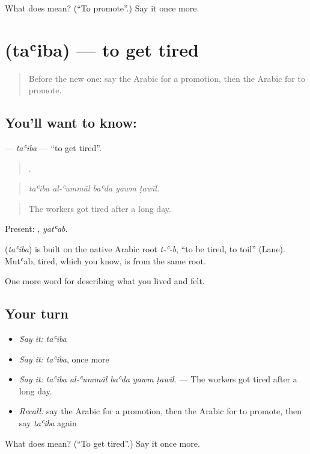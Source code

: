 \begin{tcolorbox}[breakable,colback=teal!4,colframe=teal!35!black,title={Before you move on}]
What does  mean? (\textquotedblleft{}To promote\textquotedblright{}.) Say it once more.
\end{tcolorbox}
\section[\texorpdfstring{\ar{تعب} (taʿiba)}{تعب (taʿiba)}]{ (taʿiba) — to get tired}

\label{lesson:AR-C521-taiba}



\begin{quote}
Before the new one: say the Arabic for a promotion, then the Arabic for to promote.
\end{quote}

\subsection*{You'll want to know: }
\textbf{} — \emph{taʿiba} — \textquotedblleft{}to get tired\textquotedblright{}.

\begin{quote}
    .
\end{quote}

\begin{quote}
\emph{taʿiba al-ʿummāl baʿda yawm ṭawīl.}
\end{quote}

\begin{quote}
The workers got tired after a long day.
\end{quote}

Present: , \emph{yatʿab}.

\begin{cousinweb}
\textbf{} (\emph{taʿiba}) is built on the native Arabic root \emph{t-ʿ-b}, \textquotedblleft{}to be tired, to toil\textquotedblright{} (Lane). Mutʿab, tired, which you know, is from the same root.
\end{cousinweb}

\begin{grammarlens}[title={What you've built}]
One more word for describing what you lived and felt.
\end{grammarlens}

\subsection*{Your turn}
\begin{itemize}
\raggedright
  \item \emph{Say it:} \emph{taʿiba}
  \item \emph{Say it:} \emph{taʿiba}, once more
  \item \emph{Say it:} \emph{taʿiba al-ʿummāl baʿda yawm ṭawīl.} — The workers got tired after a long day.
  \item \emph{Recall:} say the Arabic for a promotion, then the Arabic for to promote, then say \emph{taʿiba} again
\end{itemize}

\begin{tcolorbox}[breakable,colback=teal!4,colframe=teal!35!black,title={Before you move on}]
What does  mean? (\textquotedblleft{}To get tired\textquotedblright{}.) Say it once more.
\end{tcolorbox}
